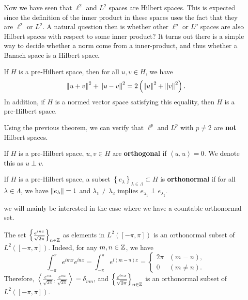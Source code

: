 \documentclass[a4paper]{article}
\renewcommand{\braket}[2]{\left\langle #1, #1 \right\rangle}
\begin{document}
Now we have seen that $\ell^2$ and $L^2$ spaces are
Hilbert spaces. This is expected since the definition
of the inner product in these spaces uses the fact
that they are $\ell^2$ or $L^2$.
A natural question then is whether
other $\ell^p$ or $L^p$ spaces are also Hilbert spaces
with respect to some inner product?
It turns out there is a simple way to decide whether a
norm come from a inner-product, and thus whether a
Banach space is a Hilbert space.

\begin{thm}
  If $H$ is a pre-Hilbert space, then for all $u, v \in H$,
  we have
  \[
    \left\lVert u + v\right\rVert^2 + \left\lVert u - v\right\rVert^2 = 2 \left( \left\lVert u\right\rVert^2
    + \left\lVert v\right\rVert^2 \right).
  \]
  In addition, if $H$ is a normed vector space satisfying this
  equality, then $H$ is a pre-Hilbert space.
\end{thm}

Using the previous theorem, we can verify that
$\ell^p$ and $L^p$ with $p \neq 2$ are \textbf{not}
Hilbert spaces.

\begin{defi}[Orthogonal]
  If $H$ is a pre-Hilbert space, $u, v \in H$ are
  \textbf{orthogonal} if $\braket{u}{v} = 0$.
  We denote this as $u \perp v$.
\end{defi}

\begin{defi}
  If $H$ is a pre-Hilbert space, a subset $\left\{ e_\lambda
    \right\}_{\lambda \in \Lambda} \subset H$ is
  \textbf{orthonormal} if for all $\lambda \in \Lambda$,
  we have $\left\lVert e_\lambda\right\rVert = 1$ and $\lambda_1 \neq \lambda_2$
  implies $e_{\lambda_1} \perp e_{\lambda_2}$.
\end{defi}

\begin{remark}
  we will mainly be interested in the case where we have a
  countable orthonormal set.
\end{remark}

\begin{eg}
  The set $\left\{ \frac{e^{i n x}}{\sqrt{2\pi}} \right\}_{n \in \mathbb{Z}}$
  as elements in $L^2([-\pi, \pi])$
  is an orthonormal subset of $L^2([-\pi, \pi])$.
  Indeed, for any $m, n \in \mathbb{Z}$, we have
  \[
    \int_{-\pi}^\pi e^{imx} \bar{e^{inx}}
    = \int_{-\pi}^\pi e^{i(m - n)x}
    = \begin{cases}
      2 \pi & (m = n),    \\
      0     & (m \neq n).
    \end{cases}
  \]
  Therefore, $\braket{\frac{e^{inx}}{\sqrt{2\pi}}}{\frac{e^{imx}}
      {\sqrt{2\pi}}} = \delta_{mn}$, and $\left\{ \frac{e^{i n x}}{\sqrt{2\pi}}
    \right\}_{n \in \mathbb{Z}}$ is an orthonormal subset
  of $L^2([-\pi, \pi])$.
\end{eg}
\end{document}
